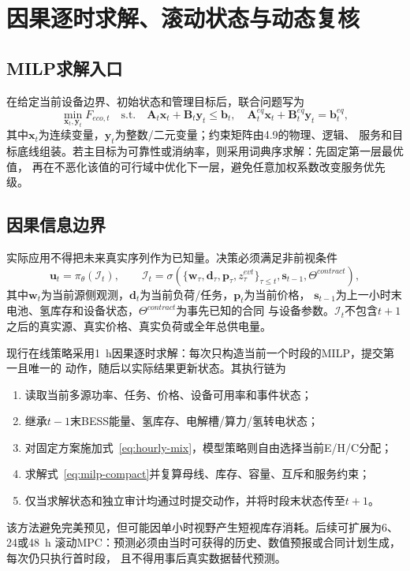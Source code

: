 \section{因果逐时求解、滚动状态与动态复核}
\label{sec:solution}

\subsection{MILP求解入口}

在给定当前设备边界、初始状态和管理目标后，联合问题写为
\begin{equation}
\min_{\bm x_t,\bm y_t} F_{eco,t}
\quad\mathrm{s.t.}\quad
\bm A_t\bm x_t+\bm B_t\bm y_t\le\bm b_t,
\quad
\bm A_t^{eq}\bm x_t+\bm B_t^{eq}\bm y_t=\bm b_t^{eq},
\label{eq:milp-compact}
\end{equation}
其中$\bm x_t$为连续变量，$\bm y_t$为整数/二元变量；约束矩阵由4.9的物理、逻辑、
服务和目标底线组装。若主目标为可靠性或消纳率，则采用词典序求解：先固定第一层最优值，
再在不恶化该值的可行域中优化下一层，避免任意加权系数改变服务优先级。

\subsection{因果信息边界}

实际应用不得把未来真实序列作为已知量。决策必须满足非前视条件
\begin{equation}
\bm u_t=\pi_\theta(\mathcal I_t),\qquad
\mathcal I_t=\sigma\!\left(
\{\bm w_\tau,\bm d_\tau,\bm p_\tau,z_\tau^{evt}\}_{\tau\le t},
\bm s_{t-1},\Theta^{contract}\right),
\label{eq:causal-policy}
\end{equation}
其中$\bm w_t$为当前源侧观测，$\bm d_t$为当前负荷/任务，$\bm p_t$为当前价格，
$\bm s_{t-1}$为上一小时末电池、氢库存和设备状态，$\Theta^{contract}$为事先已知的合同
与设备参数。$\mathcal I_t$不包含$t+1$之后的真实源、真实价格、真实负荷或全年总供电量。

现行在线策略采用1~h因果逐时求解：每次只构造当前一个时段的MILP，提交第一且唯一的
动作，随后以实际结果更新状态。其执行链为
\begin{enumerate}[label=(\arabic*)]
\item 读取当前多源功率、任务、价格、设备可用率和事件状态；
\item 继承$t-1$末BESS能量、氢库存、电解槽/算力/氢转电状态；
\item 对固定方案施加式~\eqref{eq:hourly-mix}，模型策略则自由选择当前E/H/C分配；
\item 求解式~\eqref{eq:milp-compact}并复算母线、库存、容量、互斥和服务约束；
\item 仅当求解状态和独立审计均通过时提交动作，并将时段末状态传至$t+1$。
\end{enumerate}
该方法避免完美预见，但可能因单小时视野产生短视库存消耗。后续可扩展为6、24或48~h
滚动MPC：预测必须由当时可获得的历史、数值预报或合同计划生成，每次仍只执行首时段，
且不得用事后真实数据替代预测。

